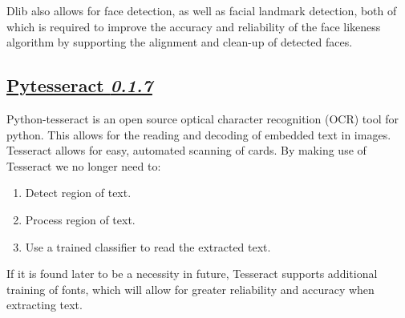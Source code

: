\documentclass{article}
\begin{document}
		\noindent
		Dlib also allows for face detection, as well as facial landmark 
		detection, both of which is required to improve the
		accuracy and reliability of the face likeness algorithm by supporting
		the alignment and clean-up of detected faces.
		
		\subsection{\href{https://pypi.python.org/pypi/pytesseract}
		{Pytesseract \textit{0.1.7}}}
		Python-tesseract is an open source optical 
		character recognition (OCR) tool for python. This allows 
		for the reading and decoding of embedded text in images.\\
		
		\noindent
		Tesseract allows for easy, automated scanning of cards. By making use
		of Tesseract we no longer need to:
		\begin{enumerate}
			\item Detect region of text.
			\item Process region of text.
			\item Use a trained classifier to read the extracted text.
		\end{enumerate}
		If it is found later to be a necessity in future, Tesseract supports
		additional training of fonts, which will allow for greater
		reliability and accuracy when extracting text.  
	
	\cleardoublepage
\end{document}
